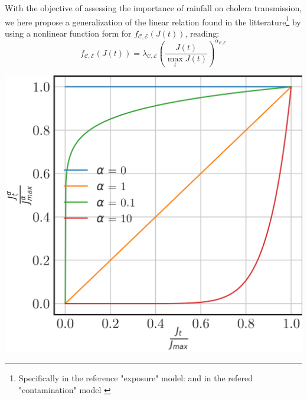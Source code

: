 With the objective of assessing the importance of rainfall on cholera transmission, we here propose a generalization of the linear relation found in the litterature\footnote{Specifically in the reference "exposure" model: \parencite{Eisenberg:ExaminingRainfallCholera:2013} and in the refered "contamination" model \parencite{Rinaldo:Reassessment20102011:2012}} by using a nonlinear function form for  $f_{\mathcal{C,E}}\left(J(t)\right)$, reading:
\begin{equation}
    f_{\mathcal{C,E}}\left(J(t)\right)=\lambda_{\mathcal{C,E}} \left(\frac{J(t)}{\max_t J(t)}\right)^{\alpha_{\mathcal{C,E}}}
    \label{eq:nonlinear_rain}
\end{equation}
\begin{marginfigure}
	\centering
	\includegraphics[width=\textwidth]{fig_cholera-rainfall/alpha.png}
	\label{fig:alpha}
\end{marginfigure}
